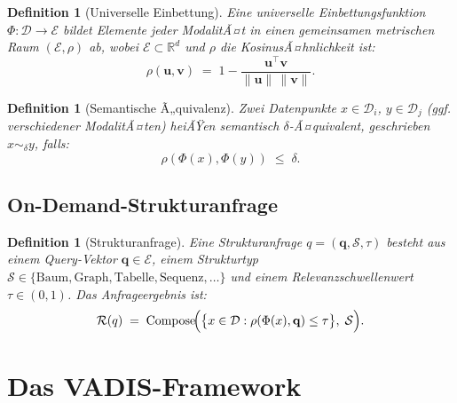 ﻿\documentclass[12pt,a4paper]{article}
\newtheorem{definition}[theorem]{Definition}
\begin{document}
\begin{definition}[Universelle Einbettung]
\label{def:embedding}
Eine universelle Einbettungsfunktion $\Phi: \mathcal{D} \to \mathcal{E}$ 
bildet Elemente jeder ModalitÃ¤t in einen gemeinsamen metrischen Raum 
$(\mathcal{E}, \rho)$ ab, wobei $\mathcal{E} \subset \mathbb{R}^d$ 
und $\rho$ die KosinusÃ¤hnlichkeit ist:
\[
  \rho(\mathbf{u}, \mathbf{v}) 
  \;=\; 1 - \frac{\mathbf{u}^\top \mathbf{v}}{\|\mathbf{u}\|\,\|\mathbf{v}\|}.
\]
\end{definition}

\begin{definition}[Semantische Ã„quivalenz]
\label{def:semequiv}
Zwei Datenpunkte $x \in \mathcal{D}_i$, $y \in \mathcal{D}_j$ 
(ggf. verschiedener ModalitÃ¤ten) heiÃŸen \emph{semantisch $\delta$-Ã¤quivalent}, 
geschrieben $x \sim_\delta y$, falls:
\[
  \rho\!\left(\Phi(x), \Phi(y)\right) \;\leq\; \delta.
\]
\end{definition}

\subsection{On-Demand-Strukturanfrage}

\begin{definition}[Strukturanfrage]
\label{def:query}
Eine Strukturanfrage $q = (\mathbf{q}, \mathcal{S}, \tau)$ besteht aus 
einem Query-Vektor $\mathbf{q} \in \mathcal{E}$, einem Strukturtyp $\mathcal{S} \in \{\text{Baum}, \text{Graph}, \text{Tabelle}, 
\text{Sequenz}, \ldots\}$ und einem Relevanz\-schwellenwert $\tau \in (0,1)$.
Das Anfrageergebnis ist:
\[
  \mathcal{R}(q) \;=\; \mathrm{Compose}\!\Bigl(
    \bigl\{ x \in \mathcal{D} : \rho(\Phi(x), \mathbf{q}) \leq \tau \bigr\},\;
    \mathcal{S}
  \Bigr).
\]
\end{definition}

\section{Das VADIS-Framework}
\label{sec:vadis}
\end{document}
